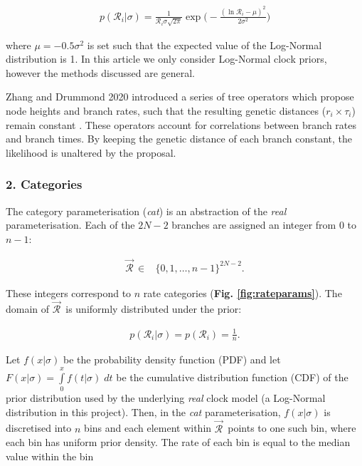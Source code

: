 \documentclass[10pt,letterpaper]{article}
\begin{document}
\begin{align}
p(\mathcal{R}_i | \sigma) = \frac{1}{\mathcal{R}_i \sigma \sqrt{2\pi}} \exp \big( -\frac{(\ln \mathcal{R}_i - \mu)^2}{2\sigma^2} \big) 
\end{align}


where $\mu = -0.5\sigma^2$ is set such that the expected value of the Log-Normal distribution is 1.
In this article we only consider Log-Normal clock priors, however the methods discussed are general.


Zhang and Drummond 2020 introduced a series of tree operators which propose node heights and branch rates, such that the resulting genetic distances ($r_i \times \tau_i$) remain constant \cite{zhang2020improving}. 
These operators account for correlations between branch rates and branch times.
By keeping the genetic distance of each branch constant, the likelihood is unaltered by the proposal. 







\subsubsection*{2. Categories}
The category parameterisation (\textit{cat}) is an abstraction of the \textit{real} parameterisation. 
Each of the $2N-2$ branches are assigned an integer from $0$ to $n-1$:

\begin{align}
\vec{\mathcal{R}}^{\,} \in& \{ 0, 1, \dotso, n-1 \}^{2N-2}.
\end{align}


These integers correspond to $n$ rate categories (\textbf{Fig. \ref{fig:rateparams}}).
The domain of $\vec{\mathcal{R}}^{\,}$ is uniformly distributed under the prior:


\begin{align}
p(\mathcal{R}_i | \sigma) = p(\mathcal{R}_i) = \frac{1}{n}.
\end{align}



Let $f(x|\sigma)$ be the probability density function (PDF) and let $F(x|\sigma) = \int\limits_{0}^{x} f(t|\sigma) \; dt$ be the cumulative distribution function (CDF) of the prior distribution used by the underlying \textit{real} clock model (a Log-Normal distribution in this project). 
Then, in the \textit{cat} parameterisation, $f(x|\sigma)$ is discretised into $n$ bins and each element within $\vec{\mathcal{R}}^{\,}$ points to one such bin,
where each bin has uniform prior density.
 The rate of each bin is equal to the median value within the bin 
\end{document}
